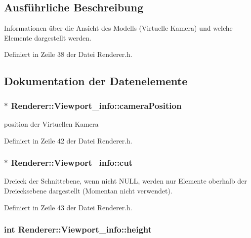 \subsection{Ausführliche Beschreibung}
Informationen über die Ansicht des Modells (Virtuelle Kamera) und welche Elemente dargestellt werden. 

Definiert in Zeile 38 der Datei Renderer.\-h.



\subsection{Dokumentation der Datenelemente}
\hypertarget{structRenderer_1_1Viewport__info_aa6b5d9d9dbde8c74e25af98680b7ccce}{
\subsubsection[{camera\-Position}]{$\ast$ Renderer\-::\-Viewport\-\_\-info\-::camera\-Position}}\label{structRenderer_1_1Viewport__info_aa6b5d9d9dbde8c74e25af98680b7ccce}


position der Virtuellen Kamera 



Definiert in Zeile 42 der Datei Renderer.\-h.

\hypertarget{structRenderer_1_1Viewport__info_af6fe77b0bf872e7d65079bb58e9e8cce}{
\subsubsection[{cut}]{$\ast$ Renderer\-::\-Viewport\-\_\-info\-::cut}}\label{structRenderer_1_1Viewport__info_af6fe77b0bf872e7d65079bb58e9e8cce}


Dreieck der Schnittebene, wenn nicht N\-U\-L\-L, werden nur Elemente oberhalb der Dreiecksebene dargestellt (Momentan nicht verwendet). 



Definiert in Zeile 43 der Datei Renderer.\-h.

\hypertarget{structRenderer_1_1Viewport__info_acd3f381981791f2b012129fe54aee39c}{
\subsubsection[{height}]{\setlength{\rightskip}{0pt plus 5cm}int Renderer\-::\-Viewport\-\_\-info\-::height}}\label{structRenderer_1_1Viewport__info_acd3f381981791f2b012129fe54aee39c}


